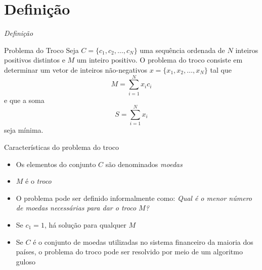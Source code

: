 \section{Definição}

\begin{frame}[fragile]{{\it Definição}}

    \begin{block}{Problema do Troco}
        Seja $C = \{c_1, c_2, \ldots, c_N\}$ uma sequência ordenada de $N$ inteiros positivos
        distintos
        e $M$ um inteiro positivo. O problema do troco consiste em determinar um vetor de inteiros
        não-negativos $x = \{ x_1, x_2, \ldots, x_N \}$ tal que
        \[
            M = \sum_{i = 1}^N x_ic_i
        \]
        e que a soma
        \[
            S = \sum_{i = 1}^N x_i
        \] seja mínima.
    \end{block}

\end{frame}

\begin{frame}[fragile]{Características do problema do troco}

    \begin{itemize}
        \item Os elementos do conjunto $C$ são denominados \textit{moedas}

        \item $M$ é o \textit{troco}

        \item O problema pode ser definido informalmente como: \textit{Qual é o menor número de
            moedas necessárias para dar o troco $M$?}

        \item Se $c_1 = 1$, há solução para qualquer $M$

        \item Se $C$ é o conjunto de moedas utilizadas no sistema financeiro da maioria dos
            países, o problema do troco pode ser resolvido por meio de um algoritmo guloso
    \end{itemize}

\end{frame}

